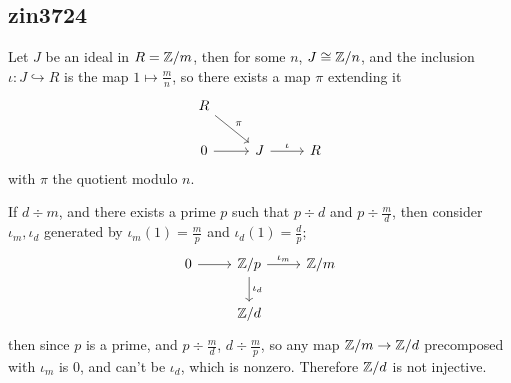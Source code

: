 \subsection{zin3724}
Let $J$ be an ideal in $R=\mathbb{Z}/m$, then for some $n$, $J\cong\mathbb{Z}/n$, and the inclusion $\iota:J\hookrightarrow R$ is the map $1\mapsto\frac{m}{n}$, so there exists a map $\pi$ extending it
\[
\begin{tikzcd}
    R \arrow[rd, "\pi"] &                      &   \\
    0 \arrow[r]         & J \arrow[r, "\iota"] & R
    \end{tikzcd}
\]
with $\pi$ the quotient modulo $n$.

If $d\div m$, and there exists a prime $p$ such that $p\div d$ and $p\div \frac{m}{d}$, then consider $\iota_m,\iota_d$ generated by $\iota_m(1)=\frac{m}{p}$ and $\iota_d(1)=\frac{d}{p}$;
\[
\begin{tikzcd}
    0 \arrow[r] & \mathbb{Z}/p \arrow[r, "\iota_m"] \arrow[d, "\iota_d"] & \mathbb{Z}/m \\
                & \mathbb{Z}/d                                           &             
    \end{tikzcd}
\]
then since $p$ is a prime, and $p\div\frac{m}{d}$, $d\div\frac{m}{p}$, so any map $\mathbb{Z}/m\rightarrow\mathbb{Z}/d$ precomposed with $\iota_m$ is 0, and can't be $\iota_d$, which is nonzero. Therefore $\mathbb{Z}/d$ is not injective.
